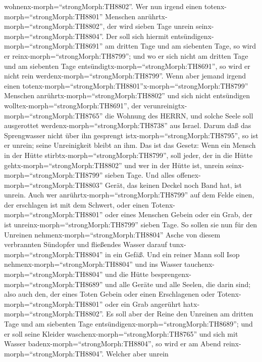 wohnenx-morph=``strongMorph:TH8802''.  Wer nun irgend einen
totenx-morph=``strongMorph:TH8801'' Menschen
anrührtx-morph=``strongMorph:TH8802'', der wird sieben Tage unrein
seinx-morph=``strongMorph:TH8804''.  Der soll sich hiermit
entsündigenx-morph=``strongMorph:TH8691'' am dritten Tage und am
siebenten Tage, so wird er reinx-morph=``strongMorph:TH8799''; und wo er
sich nicht am dritten Tage und am siebenten Tage
entsündigtx-morph=``strongMorph:TH8691'', so wird er nicht rein
werdenx-morph=``strongMorph:TH8799''.  Wenn aber jemand
irgend einen
totenx-morph=``strongMorph:TH8801''x-morph=``strongMorph:TH8799''
Menschen anrührtx-morph=``strongMorph:TH8802'' und sich nicht
entsündigen wolltex-morph=``strongMorph:TH8691'', der
verunreinigtx-morph=``strongMorph:TH8765'' die Wohnung des HERRN, und
solche Seele soll ausgerottet werdenx-morph=``strongMorph:TH8738'' aus
Israel. Darum daß das Sprengwasser nicht über ihn gesprengt
istx-morph=``strongMorph:TH8795'', so ist er unrein; seine Unreinigkeit
bleibt an ihm.  Das ist das Gesetz: Wenn ein Mensch in der
Hütte stirbtx-morph=``strongMorph:TH8799'', soll jeder, der in die Hütte
gehtx-morph=``strongMorph:TH8802'' und wer in der Hütte ist, unrein
seinx-morph=``strongMorph:TH8799'' sieben Tage.  Und alles
offenex-morph=``strongMorph:TH8803'' Gerät, das keinen Deckel noch Band
hat, ist unrein.  Auch wer
anrührtx-morph=``strongMorph:TH8799'' auf dem Felde einen, der
erschlagen ist mit dem Schwert, oder einen
Totenx-morph=``strongMorph:TH8801'' oder eines Menschen Gebein oder ein
Grab, der ist unreinx-morph=``strongMorph:TH8799'' sieben Tage.
 So sollen sie nun für den Unreinen
nehmenx-morph=``strongMorph:TH8804'' Asche von diesem verbrannten
Sündopfer und fließendes Wasser darauf tunx-morph=``strongMorph:TH8804''
in ein Gefäß.  Und ein reiner Mann soll Isop
nehmenx-morph=``strongMorph:TH8804'' und ins Wasser
tauchenx-morph=``strongMorph:TH8804'' und die Hütte
besprengenx-morph=``strongMorph:TH8689'' und alle Geräte und alle
Seelen, die darin sind; also auch den, der eines Toten Gebein oder einen
Erschlagenen oder Totenx-morph=``strongMorph:TH8801'' oder ein Grab
angerührt hatx-morph=``strongMorph:TH8802''.  Es soll aber
der Reine den Unreinen am dritten Tage und am siebenten Tage
entsündigenx-morph=``strongMorph:TH8689''; und er soll seine Kleider
waschenx-morph=``strongMorph:TH8765'' und sich mit Wasser
badenx-morph=``strongMorph:TH8804'', so wird er am Abend
reinx-morph=``strongMorph:TH8804''.  Welcher aber unrein
